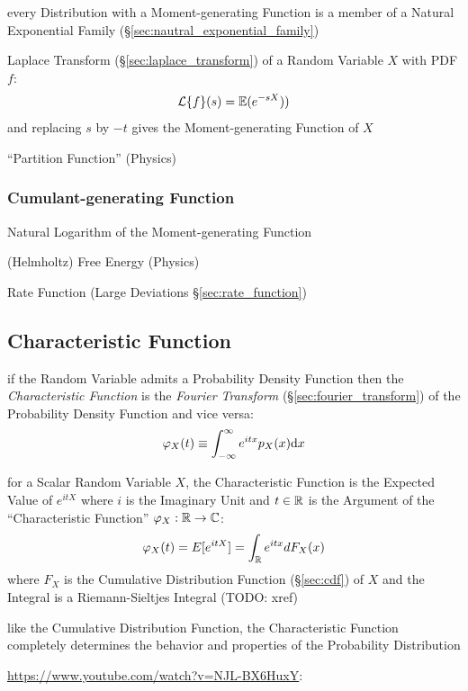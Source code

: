 every Distribution with a Moment-generating Function is a member of a Natural
Exponential Family (\S\ref{sec:nautral_exponential_family})

Laplace Transform (\S\ref{sec:laplace_transform}) of a Random Variable $X$ with
PDF $f$:
\[
  \mathcal{L}\{f\}(s) = \mathbb{E}(e^{-sX}))
\]
and replacing $s$ by $-t$ gives the Moment-generating Function of $X$

``Partition Function'' (Physics)



\subsubsection{Cumulant-generating Function}
\label{sec:cumulant_generating_function}

Natural Logarithm of the Moment-generating Function

(Helmholtz) Free Energy (Physics)

Rate Function (Large Deviations \S\ref{sec:rate_function})



\subsection{Characteristic Function}\label{sec:characteristic_function}

if the Random Variable admits a Probability Density Function then the
\emph{Characteristic Function} is the \emph{Fourier Transform}
(\S\ref{sec:fourier_transform}) of the Probability Density Function and vice
versa:
\[
  \varphi_X(t) \equiv \int_{-\infty}^\infty e^{itx} p_X(x) \mathrm{d}x
\]

for a Scalar Random Variable $X$, the Characteristic Function is the Expected
Value of $e^{itX}$ where $i$ is the Imaginary Unit and $t \in \mathbb{R}$ is the
Argument of the ``Characteristic Function'' $\varphi_X : \mathbb{R} \to \mathbb{C}$:
\[
  \varphi_X(t) = E[e^{itX}] = \int_{\mathbb{R}} e^{itx} dF_X(x)
\]
where $F_X$ is the Cumulative Distribution Function (\S\ref{sec:cdf}) of $X$ and
the Integral is a Riemann-Sieltjes Integral (TODO: xref)

like the Cumulative Distribution Function, the Characteristic Function
completely determines the behavior and properties of the Probability
Distribution

\url{https://www.youtube.com/watch?v=NJL-BX6HuxY}:

